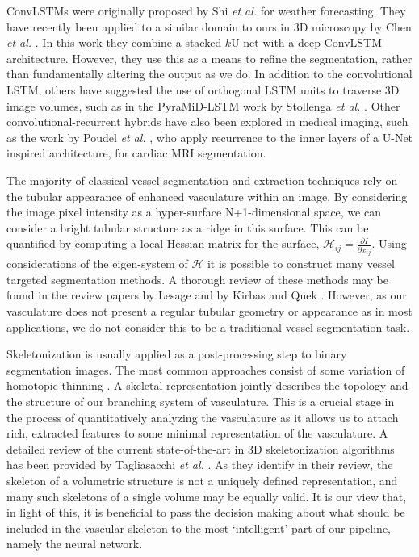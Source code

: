 \documentclass[journal,transmag]{IEEEtran}
\newcommand{\pder}[2][]{\frac{\partial#1}{\partial#2}}
\begin{document}
ConvLSTMs were originally proposed by Shi \textit{et al.} \cite{SHI2015} for weather forecasting.
They have recently been applied to a similar domain to ours in 3D microscopy by Chen \emph{et al.} \cite{Chen2016}. In this work they combine a stacked $k$U-net with a deep ConvLSTM architecture. However, they use this as a means to refine the segmentation, rather than fundamentally altering the output as we do. In addition to the convolutional LSTM, others have suggested the use of orthogonal LSTM units to traverse 3D image volumes, such as in the PyraMiD-LSTM work by Stollenga \emph{et al.} \cite{Stollenga2015}. Other convolutional-recurrent hybrids have also been explored in medical imaging, such as the work by Poudel \textit{et al.} \cite{Poudel2016}, who apply recurrence to the inner layers of a U-Net inspired architecture, for cardiac MRI segmentation.

The majority of classical vessel segmentation and extraction techniques rely on the tubular appearance of enhanced vasculature within an image. By considering the image pixel intensity as a hyper-surface N+1-dimensional space, we can consider a bright tubular structure as a ridge in this surface. This can be quantified by computing a local Hessian matrix for the surface, $\mathcal{H}_{ij} = \pder[I]{x_{ij}}$. Using considerations of the eigen-system of $\mathcal{H}$ it is possible to construct many vessel targeted segmentation methods. A thorough review of these methods may be found in the review papers by Lesage \cite{Lesage2009} and by Kirbas and Quek \cite{Kirbas2003}. However, as our vasculature does not present a regular tubular geometry or appearance as in most applications, we do not consider this to be a traditional vessel segmentation task.

Skeletonization is usually applied as a post-processing step to binary segmentation images. The most common approaches consist of some variation of homotopic thinning \cite{Pudney1998}. A skeletal representation jointly describes the topology and the structure of our branching system of vasculature. This is a crucial stage in the process of quantitatively analyzing the vasculature as it allows us to attach rich, extracted features to some minimal representation of the vasculature.  A detailed review of the current state-of-the-art in 3D skeletonization algorithms has been provided by Tagliasacchi \emph{et al.} \cite{Tagliasacchi2016}. As they identify in their review, the skeleton of a volumetric structure is not a uniquely defined representation, and many such skeletons of a single volume may be equally valid. It is our view that, in light of this, it is beneficial to pass the decision making about what should be included in the vascular skeleton to the most `intelligent' part of our pipeline, namely the neural network.
\end{document}
